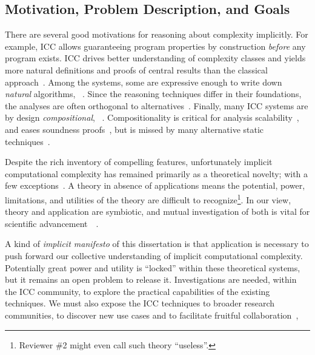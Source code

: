 \subsection{Motivation, Problem Description, and Goals}

There are several good motivations for reasoning about complexity implicitly.
For example, ICC allows guaranteeing program properties by construction \emph{before} any program exists.
ICC drives better understanding of complexity classes and yields more natural definitions and proofs of central results than the classical approach~\cite{kristiansen2017}.
Among the systems, some are expressive enough to write down \emph{natural} algorithms, \eg~\cite{jones2009,marion2011}.
Since the reasoning techniques differ in their foundations, the analyses are often orthogonal to alternatives~\cite{aubert20222}.
Finally, many ICC systems are by design \emph{compositional}, \eg~\cite{jones2009,marion2011,hainry2023,atkey2024}.
Compositionality is critical for analysis scalability~\cite{carbonneaux2015}, and eases soundness proofs~\cite{keidel2021},
but is missed by many alternative static techniques~\cite{carbonneaux2015,schiebel2024}.

Despite the rich inventory of compelling features, unfortunately implicit computational complexity has remained primarily as a theoretical novelty;
with a few exceptions~\cite{avanzini2017,avanzini2008,moyen20172,hoffmann2012,hainry2021}.
A theory in absence of applications means the potential, power, limitations, and utilities of the theory are difficult to recognize\footnote{
Reviewer \#2 might even call such theory \enquote{useless}.}.
In our view, theory and application are symbiotic, and mutual investigation of both is vital for scientific advancement~\cite[pg. xxxv]{bishop2003}~\cite[p. 75]{moyen2017}.

A kind of \emph{implicit manifesto} of this dissertation is that application is necessary to push forward our collective understanding of implicit computational complexity.
Potentially great power and utility is \enquote{locked} within these theoretical systems, but it remains an open problem to release it.
Investigations are needed, within the ICC community, to explore the practical capabilities of the existing techniques.
We must also expose the ICC techniques to broader research communities, to discover new use cases and to facilitate fruitful collaboration~\cite[p. 7]{moyen2017},

